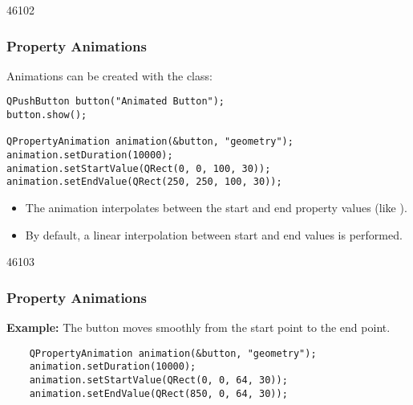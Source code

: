 
\begin{slide}[fragile]{46102}\frametitle{Property Animations}
Animations can be created with the  class:
\small
\begin{lstlisting}
QPushButton button("Animated Button");
button.show();

QPropertyAnimation animation(&button, "geometry");
animation.setDuration(10000);
animation.setStartValue(QRect(0, 0, 100, 30));
animation.setEndValue(QRect(250, 250, 100, 30));
\end{lstlisting}
\normalsize

\begin{itemize}
\item The animation interpolates between the start and end property values
(like ).
\item By default, a linear interpolation between start and end values is
performed.
\end{itemize}

\end{slide}

\begin{slide}[fragile]{46103}\frametitle{Property Animations}
\vspace*{1.0em}
\textbf{Example:} The button moves smoothly from the start point to the end point.

\vspace*{1.5em}

\small
\begin{lstlisting}
    QPropertyAnimation animation(&button, "geometry");
    animation.setDuration(10000);
    animation.setStartValue(QRect(0, 0, 64, 30));
    animation.setEndValue(QRect(850, 0, 64, 30));
\end{lstlisting}
\normalsize
{}

\end{slide}

\label{Animation-Key-Values}

